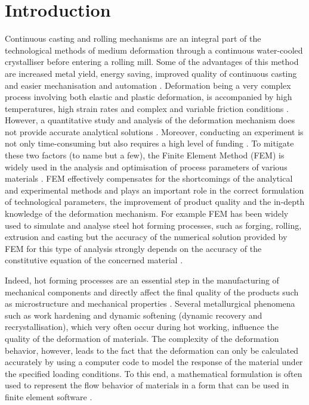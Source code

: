 \documentclass[twoside,english,1p,final,sort&compress]{elsarticle}
\theoremstyle{plain}
\begin{document}
\section{Introduction\label{sec:Introduction}}
Continuous casting and rolling mechanisms are an integral part of the technological methods of medium deformation through a continuous water-cooled crystalliser before entering a rolling mill. Some of the advantages of this method are increased metal yield, energy saving, improved quality of continuous casting and easier mechanisation and automation . Deformation being a very complex process involving both elastic and plastic deformation, is accompanied by high temperatures, high strain rates and complex and variable friction conditions \cite{he2013comparative}. However, a quantitative study and analysis of the deformation mechanism does not provide accurate analytical solutions . Moreover, conducting an experiment is not only time-consuming but also requires a high level of funding \cite{changizian2012high}. To mitigate these two factors (to name but a few), the Finite Element Method (FEM) is widely used in the analysis and optimisation of process parameters of various materials . FEM effectively compensates for the shortcomings of the analytical and experimental methods and plays an important role in the correct formulation of technological parameters, the improvement of product quality and the in-depth knowledge of the deformation mechanism. For example FEM has been widely used to simulate and analyse steel hot forming processes, such as forging, rolling, extrusion and casting but the accuracy of the numerical solution provided by FEM for this type of analysis strongly depends  on the accuracy of the constitutive equation of the concerned material \cite{qin2010modeling, mandal2009constitutive, ji2018constitutive}. 

Indeed, hot forming processes are an essential step in the manufacturing of mechanical components and directly affect the ﬁnal quality of the products such as microstructure and mechanical properties \cite{ashtiani2012constitutive}. Several metallurgical phenomena such as work hardening and dynamic softening (dynamic recovery and recrystallisation), which very often occur during hot working, influence the quality of the deformation of materials. The complexity of the deformation behavior, however, leads to the fact that the deformation can only be calculated accurately by using a computer code to model the response of the material under the specified loading conditions. To this end, a mathematical formulation is often used to represent the flow behavior of materials in a form that can be used in finite element software \cite{lin2008prediction,wu2012flow}.
\end{document}
